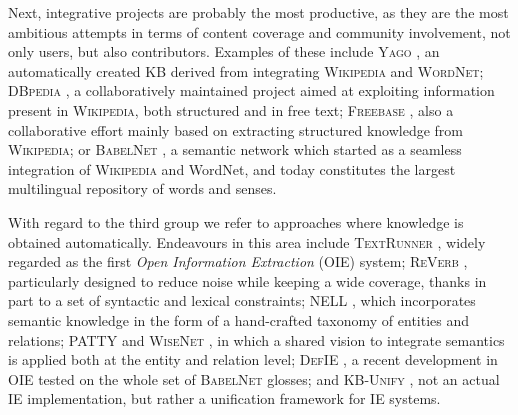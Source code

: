 Next, integrative projects are probably the most productive, as they are the most ambitious attempts in terms of content coverage and community involvement, not only users, but also contributors. Examples of these include \textsc{Yago} \citep{Suchaneketal2007}, an automatically created \textsc{KB} derived from integrating \textsc{Wikipedia} and \textsc{WordNet}; \textsc{DBpedia} \citep{Lehmanetal2014}, a collaboratively maintained project aimed at exploiting information present in \textsc{Wikipedia}, both structured and in free text; \textsc{Freebase} \citep{Bollacketal2008}, also a collaborative effort mainly based on extracting structured knowledge from \textsc{Wikipedia}; or \textsc{BabelNet} \citep{NavigliPonzetto2012}, a semantic network which started as a seamless integration of \textsc{Wikipedia} and WordNet, and today constitutes the largest multilingual repository of words and senses.

With regard to the third group we refer to approaches where knowledge is obtained automatically. 
Endeavours in this area include \textsc{TextRunner} \citep{Bankoetal2007}, widely regarded as the first \textit{Open Information Extraction} (OIE) system; \textsc{ReVerb} \citep{Fader2011}, particularly designed to reduce noise while keeping a wide coverage, thanks in part to a set of syntactic and lexical constraints; \textsc{NELL} \citep{Carlson2010}, which incorporates semantic knowledge in the form of a hand-crafted taxonomy of entities and relations; \textsc{PATTY} \citep{Nakasholeetal2012} and \textsc{WiseNet} \citep{MoroandNavigli2012,MoroandNavigli2013}, in which a shared vision to integrate semantics is applied both at the entity and relation level; \textsc{DefIE} \citep{DelliBovietal2015b}, a recent development in OIE tested on the whole set of \textsc{BabelNet} glosses; and \textsc{KB-Unify} \citep{DelliBovietal2015}, not an actual IE implementation, but rather a unification framework for IE systems.


